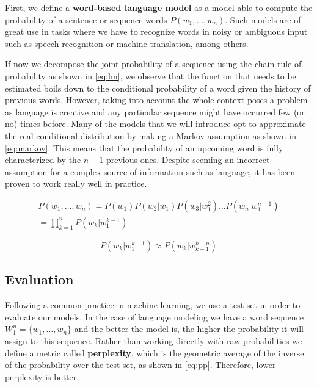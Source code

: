 First, we define a \textbf{word-based language model} as a model able to compute the probability of a sentence or sequence words $P(w_1, \ldots ,w_n)$. Such models are of great use in tasks where we have to recognize words in noisy or ambiguous input such as speech recognition or machine translation, among others.

If now we decompose the joint probability of a sequence using the chain rule of probability as shown in \autoref{eq:lm}, we observe that the function that needs to be estimated boils down to the conditional probability of a word given the history of previous words. However, taking into account the whole context poses a problem as language is creative and any particular sequence might have occurred few (or no) times before.  Many of the models that we will introduce opt to approximate the real conditional distribution by making a Markov assumption as shown in \autoref{eq:markov}. This means that the probability of an upcoming word is fully characterized by the $n-1$ previous ones. Despite seeming an incorrect assumption for a complex source of information such as language, it has been proven to work really well in practice.

\begin{equation} \label{eq:lm}
	\begin{gathered}
		P(w_1, \ldots ,w_n)=P(w_1)P(w_2|w_1)P(w_3|w_{1}^{2}) \ldots P(w_n|w_{1}^{n-1}) \\
		= \prod_{k=1}^{n} P(w_k|w_{1}^{k-1})
	\end{gathered}
\end{equation}

\begin{equation} \label{eq:markov}
	P(w_k|w_{1}^{k-1}) \approx P(w_k|w_{k-1}^{k-n})
\end{equation}

\subsection{Evaluation}

Following a common practice in machine learning, we use a test set in order to evaluate our models. In the case of language modeling we have a word sequence $W_1^n=\{w_1, \ldots , w_n\}$ and the better the model is, the higher the probability it will assign to this sequence. Rather than working directly with raw probabilities we define a metric called \textbf{perplexity}, which is the geometric average of the inverse of the probability over the test set, as shown in \autoref{eq:pp}. Therefore, lower perplexity is better.


